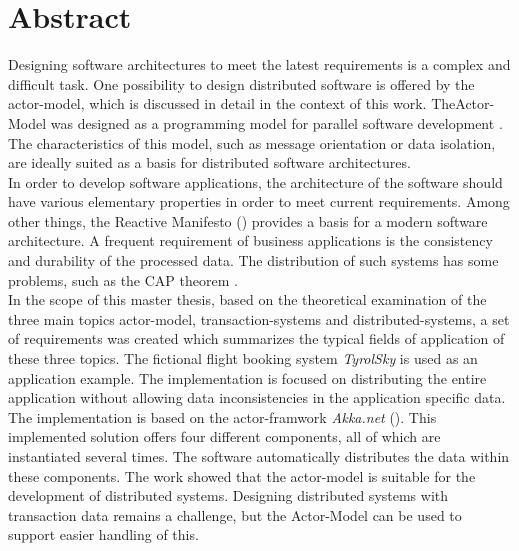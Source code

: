 
\chapter*{Abstract}
Designing software architectures to meet the latest requirements is a complex and difficult task. One possibility to design distributed software is offered by the actor-model, which is discussed in detail in the context of this work. TheActor-Model was designed as a programming model for parallel software development \citep{hewitt1973session}. The characteristics of this model, such as message orientation or data isolation, are ideally suited as a basis for distributed software architectures. \\
In order to develop software applications, the architecture of the software should have various elementary properties in order to meet current requirements. Among other things, the Reactive Manifesto (\cite{reactiveManifesto}) provides a basis for a modern software architecture. 
A frequent requirement of business applications is the consistency and durability of the processed data. The distribution of such systems has some problems, such as the CAP theorem \citep{gilbertPerspectiveCAPTheorem2012}. \\
In the scope of this master thesis, based on the theoretical examination of the three main topics actor-model, transaction-systems and distributed-systems, a set of requirements was created which summarizes the typical fields of application of these three topics. The fictional flight booking system \textit{TyrolSky} is used as an application example. The implementation is focused on distributing the entire application without allowing data inconsistencies in the application specific data. \\
The implementation is based on the actor-framwork \textit{Akka.net} (\cite{Akka.netCommunityAkka.NETDocumentation}). This implemented solution offers four different components, all of which are instantiated several times. The software automatically distributes the data within these components.
The work showed that the actor-model is suitable for the development of distributed systems. Designing distributed systems with transaction data remains a challenge, but the Actor-Model can be used to support easier handling of this.


\cleardoublepage
{} %
